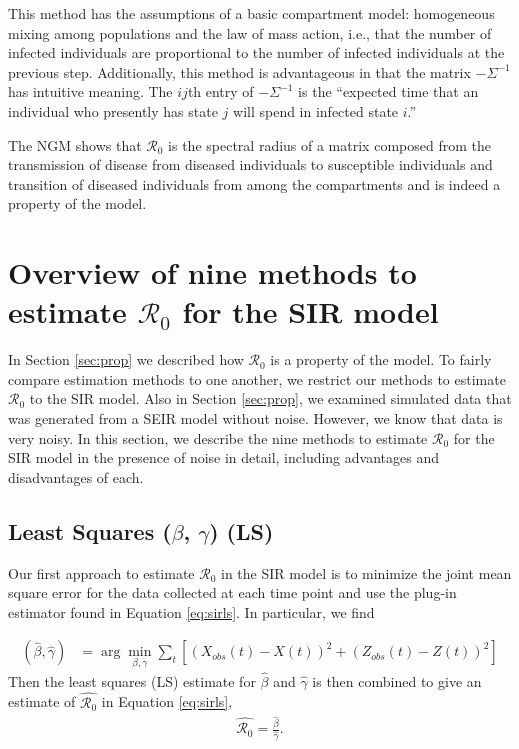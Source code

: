 \documentclass[12pt]{article}
\newcommand{\wxxsir}{nine } %
\newcommand{\rr}{\ensuremath{\mathcal{R}_0}}
\begin{document}
This method has the assumptions of a basic compartment model: homogeneous mixing among populations and the law of mass action, i.e., that the number of infected individuals are proportional to the number of infected individuals at the previous step.   Additionally, this method is advantageous in that the matrix $-\Sigma^{-1}$ has intuitive meaning.  The $ij$th entry of $- \Sigma^{-1}$ is the ``expected time that an individual who presently has state $j$ will spend in infected state $i$.''

The NGM shows that $\rr$ is the spectral radius of a matrix composed from the transmission of disease from diseased individuals to susceptible individuals and transition of diseased individuals from among the compartments and is indeed a property of the model.



\section{Overview of \wxxsir methods to estimate $\rr$ for the SIR model}
\label{sec:methods} 

In Section \ref{sec:prop} we described how $\rr$ is a property of the model.  To fairly compare estimation methods to one another, we restrict our methods to estimate $\rr$ to the SIR model.  Also in Section \ref{sec:prop}, we examined simulated data that was generated from a SEIR model without noise.  However, we know that data is very noisy.    In this section, we describe the \wxxsir methods to estimate $\rr$ for the SIR model in the presence of noise in detail, including advantages and disadvantages of each.

\subsection{Least Squares ($\beta$, $\gamma$) (LS)}\label{least-squares-beta-gamma}
Our first approach to estimate $\rr$ in the SIR model is to minimize the joint mean square error for the data collected at each time point and use the plug-in estimator found in Equation \ref{eq:sirls}.  In particular, we find

\begin{align*}
(\hat{\beta}, \hat{\gamma} )&=\arg \min_{\beta, \gamma} \sum_{t} \left [ \left (X_{obs}(t) - X(t)\right )^2 + \left ( Z_{obs}(t) - Z(t) \right )^2 \right ]
\end{align*}
Then the least squares (LS) estimate for $\hat{\beta}$ and $\hat{\gamma}$ is then combined to give an estimate of $\hat{\rr}$ in Equation \ref{eq:sirls},
\begin{align}\label{eq:sirls}
  \hat{\rr}= \frac{\hat{\beta}}{\hat{\gamma}}.
\end{align}
\end{document}
